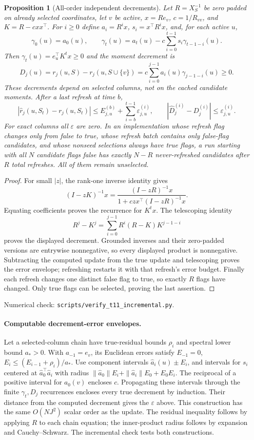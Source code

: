 \documentclass[11pt]{article}
\newtheorem{proposition}[theorem]{Proposition}
\begin{document}
\begin{proposition}[All-order independent decrements]\label{prop:incall}
Let $R=X_S^{-1}$ be zero padded on already selected coordinates,
let $v$ be active, $x=Re_v$, $c=1/R_{vv}$, and
$K=R-cxx^\top$. For $i\geq0$ define $a_i=R^ix$,
$s_i=x^\top R^ix$, and, for each active $u$,
\[
 \gamma_0(u)=a_0(u),\qquad
 \gamma_t(u)=a_t(u)-c\sum_{i=0}^{t-1}s_i\gamma_{t-1-i}(u).
\]
Then $\gamma_t(u)=e_u^\top K^tx\geq0$ and the moment decrement is
\[
 D_j(u)=r_j(u,S)-r_j(u,S\cup\{v\})
      =c\sum_{i=0}^{j-1}a_i(u)\gamma_{j-1-i}(u)\geq0.
\]
These decrements depend on selected columns, not on the cached
candidate moments. After a last refresh at time $b$,
\[
 |\widehat r_j(u,S_t)-r_j(u,S_t)|
 \leq E_{j,u}^{(b)}+\sum_{i=b}^{t-1}\varepsilon_{j,u}^{(i)},
 \qquad
 |\widehat D_j^{(i)}-D_j^{(i)}|\leq\varepsilon_{j,u}^{(i)}.
\]
For exact columns all $\varepsilon$ are zero. In an implementation
whose refresh flag changes only from false to true, whose refresh
batch contains only false-flag candidates, and whose nonseed
selections always have true flags, a run starting with all $N$
candidate flags false has exactly $N-R$ never-refreshed candidates
after $R$ total refreshes. All of them remain unselected.
\end{proposition}
\begin{proof}
For small $|z|$, the rank-one inverse identity gives
\[
 (I-zK)^{-1}x=
 \frac{(I-zR)^{-1}x}{1+czx^\top(I-zR)^{-1}x}.
\]
Equating coefficients proves the recurrence for $K^tx$.
The telescoping identity
\[
 R^j-K^j=\sum_{i=0}^{j-1}R^i(R-K)K^{j-1-i}
\]
proves the displayed decrement. Grounded inverses and their zero-padded
versions are entrywise nonnegative, so every displayed product is
nonnegative. Subtracting the computed update from the true update
and telescoping proves the error envelope; refreshing restarts it
with that refresh's error budget. Finally each refresh changes one
distinct false flag to true, so exactly $R$ flags have changed.
Only true flags can be selected, proving the last assertion.
\end{proof}
\noindent Numerical check: \texttt{scripts/verify\_t11\_incremental.py}.

\paragraph{Computable decrement-error envelopes.}
Let a selected-column chain have true-residual bounds $\rho_i$ and
spectral lower bound $a_*>0$. With $a_{-1}=e_v$, its Euclidean
errors satisfy $E_{-1}=0$, $E_i\leq(E_{i-1}+\rho_i)/a_*$.
Use component intervals $\widehat a_i(u)\pm E_i$,
and intervals for $s_i$ centered at $\widehat a_0^\top\widehat a_i$
with radius
$\|\widehat a_0\|E_i+\|\widehat a_i\|E_0+E_0E_i$.
The reciprocal of a positive interval for $a_0(v)$ encloses $c$.
Propagating these intervals through the finite $\gamma_t,D_j$
recurrences encloses every true decrement by induction. Their
distance from the computed decrement gives the $\varepsilon$
above. This construction has the same $O(NJ^2)$ scalar order as
the update. The residual inequality follows by applying $R$ to
each chain equation; the inner-product radius follows by expansion
and Cauchy--Schwarz. The incremental check tests both constructions.
\end{document}
